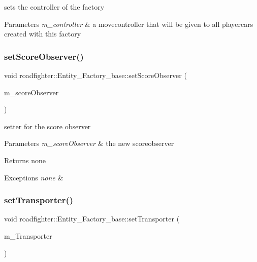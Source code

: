 sets the controller of the factory 
\begin{DoxyParams}{Parameters}
{\em m\+\_\+controller} & a movecontroller that will be given to all playercars created with this factory \\
\hline
\end{DoxyParams}
\mbox{\label{classroadfighter_1_1Entity__Factory__base_a59240ab3a76f6d54b051bc560b6d3aa1}} 
\subsubsection{\texorpdfstring{set\+Score\+Observer()}{setScoreObserver()}}
{\footnotesize\ttfamily void roadfighter\+::\+Entity\+\_\+\+Factory\+\_\+base\+::set\+Score\+Observer (\begin{DoxyParamCaption}\item[{const std\+::shared\+\_\+ptr$<$ \hyperlink{classroadfighter_1_1ObserverBase}{Observer\+Base} $>$ \&}]{m\+\_\+score\+Observer }\end{DoxyParamCaption})}

setter for the score observer 
\begin{DoxyParams}{Parameters}
{\em m\+\_\+score\+Observer} & the new scoreobserver \\
\hline
\end{DoxyParams}
\begin{DoxyReturn}{Returns}
none 
\end{DoxyReturn}

\begin{DoxyExceptions}{Exceptions}
{\em none} & \\
\hline
\end{DoxyExceptions}
\mbox{\label{classroadfighter_1_1Entity__Factory__base_ab3338a586002c58ad7581e1046be9ba5}} 
\subsubsection{\texorpdfstring{set\+Transporter()}{setTransporter()}}
{\footnotesize\ttfamily void roadfighter\+::\+Entity\+\_\+\+Factory\+\_\+base\+::set\+Transporter (\begin{DoxyParamCaption}\item[{const std\+::shared\+\_\+ptr$<$ \hyperlink{classroadfighter_1_1EntityTransporter}{Entity\+Transporter} $>$ \&}]{m\+\_\+\+Transporter }\end{DoxyParamCaption})}

